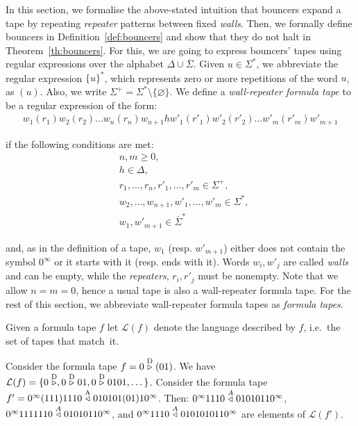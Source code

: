 In this section, we formalise the above-stated intuition that bouncers expand a tape by repeating \textit{repeater} patterns between fixed \textit{walls}. Then, we formally define bouncers in Definition~\ref{def:bouncers} and show that they do not halt in Theorem~\ref{th:bouncers}. For this, we are going to express bouncers' tapes using regular expressions over the alphabet $\Delta \cup  \overline{\Sigma}$. Given $u\in\Sigma^*$, we abbreviate the regular expression $\{u\}^*$, which represents zero or more repetitions of the word $u$, as $(u)$. Also, we write $\Sigma^+ = \Sigma^* \setminus \{ \varnothing \}$. We define a \textit{wall-repeater formula tape} to be a regular expression of the form:
\begin{align}\label{math:formulaTapes}w_1(r_1)w_2(r_2)\dots w_n(r_n) w_{n+1} h w'_1(r'_1)w'_2(r'_2)\dots w'_m(r'_m) w'_{m+1}\end{align}

if the following conditions are met:
\begin{align*}
     & n,m \geq 0,                                     \\
     & h \in \Delta,                                   \\
     & r_1,\dots,r_n,r'_1,\dots,r'_m \in \Sigma^+,     \\
     & w_2,\dots,w_{n+1},w'_1,\dots,w'_m \in \Sigma^*, \\
     & w_1, w'_{m+1} \in  \overline{\Sigma}^*
\end{align*}

and, as in the definition of a tape, $w_1$ (resp. $w'_{m+1}$) either does not contain the symbol $0^\infty$ or it starts with it (resp. ends with it). Words $w_i, w'_j$ are called \textit{walls} and can be empty, while the \textit{repeaters}, $r_i, r'_j$ must be nonempty. Note that we allow $n=m=0$, hence a usual tape is also a wall-repeater formula tape. For the rest of this section, we abbreviate wall-repeater formula tapes as \textit{formula tapes}.

Given a formula tape $f$ let $\mathcal{L}(f)$ denote the language described by $f$, i.e.\ the set of tapes that match~it.

\begin{example}\label{ex:formulaTapes}
    Consider the formula tape $f = 0 \stackrel{\text{D}}\triangleright (01)$. We have $\mathcal{L}(f) = \{0\stackrel{\text{D}}\triangleright,0\stackrel{\text{D}}\triangleright01,0\stackrel{\text{D}}\triangleright0101,\dots\}$. Consider the formula tape $f'=0^\infty(111)1110 \stackrel{\text{A}}\triangleleft 010101(01)10^\infty$. Then: $0^\infty 1110 \stackrel{A}\triangleleft 01010110^\infty$, $0^\infty 1111110 \stackrel{A}\triangleleft 01010110^\infty$, and $0^\infty 1110 \stackrel{A}\triangleleft 0101010110^\infty$ are elements of $\mathcal{L}(f')$.
\end{example}

